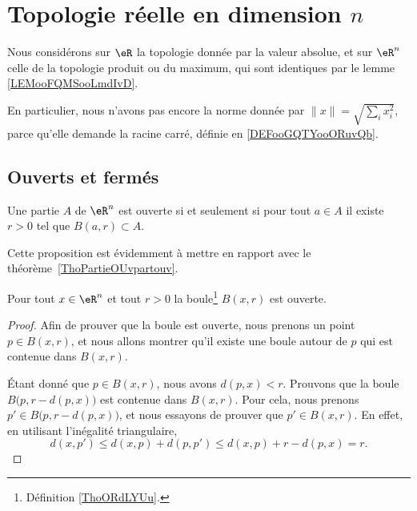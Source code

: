 \section{Topologie réelle en dimension \( n\)}

Nous considérons sur \( \eR\) la topologie donnée par la valeur absolue, et sur \( \eR^n\) celle de la topologie produit ou du maximum, qui sont identiques par le lemme \ref{LEMooFQMSooLmdIvD}.

En particulier, nous n'avons pas encore la norme donnée par \( \| x \|=\sqrt{ \sum_ix_i^2 }\), parce qu'elle demande la racine carré, définie en \ref{DEFooGQTYooORuvQb}.

\subsection{Ouverts et fermés}

\begin{proposition}\label{PROPooEQYJooBbPiAj}
	Une partie \( A\) de \( \eR^n\) est ouverte si et seulement si pour tout \( a\in A\) il existe \( r>0\) tel que \( B(a,r)\subset A\).
\end{proposition}
Cette proposition est évidemment à mettre en rapport avec le théorème~\ref{ThoPartieOUvpartouv}.

\begin{lemma}   \label{LemMESSExh}
	Pour tout \( x \in \eR^n\) et tout \( r >0\) la boule\footnote{Définition \ref{ThoORdLYUu}.} \( B(x,r)\) est ouverte.
\end{lemma}

\begin{proof}
	Afin de prouver que la boule est ouverte, nous prenons un point \( p\in B(x,r)\), et nous allons montrer qu'il existe une boule autour de \( p\) qui est contenue dans \( B(x,r)\).

	Étant donné que \( p\in B(x,r)\), nous avons \( d(p,x)<r\). Prouvons que la boule \( B\big(p,r-d(p,x)\big)\) est contenue dans \( B(x,r)\). Pour cela, nous prenons \( p'\in B\big(p,r-d(p,x)\big)\), et nous essayons de prouver que \( p'\in B(x,r)\). En effet, en utilisant l'inégalité triangulaire,
	\begin{equation}
		d(x,p')\leq d(x,p)+d(p,p')\leq d(x,p)+r-d(p,x)=r.
	\end{equation}
\end{proof}

